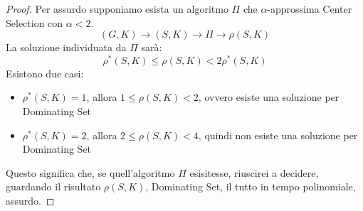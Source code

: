 \begin{proof}
    Per assurdo supponiamo esista un algoritmo $\Pi$ che $\alpha$-approssima 
    Center Selection con $\alpha < 2$.
    $$(G,K)\longrightarrow(S,K)\longrightarrow \Pi \longrightarrow \rho(S,K)$$
    La soluzione individuata da $\Pi$ sarà:
    $$\rho^*(S,K) \leq \rho(S,K) < 2\rho^*(S,K)$$
    Esistono due casi:
    \begin{itemize}
        \item $\rho^*(S,K) = 1$, allora $1\leq \rho(S,K) < 2$, ovvero esiste una soluzione 
        per Dominating Set
        \item $\rho^*(S,K) = 2$, allora $2\leq \rho(S,K) < 4$, quindi non esiste una soluzione 
        per Dominating Set
    \end{itemize}
    Questo significa che, se quell'algoritmo $\Pi$ esisitesse, riuscirei a decidere, 
    guardando il risultato $\rho(S,K)$, Dominating Set, il tutto in tempo polinomiale, assurdo.
\end{proof}